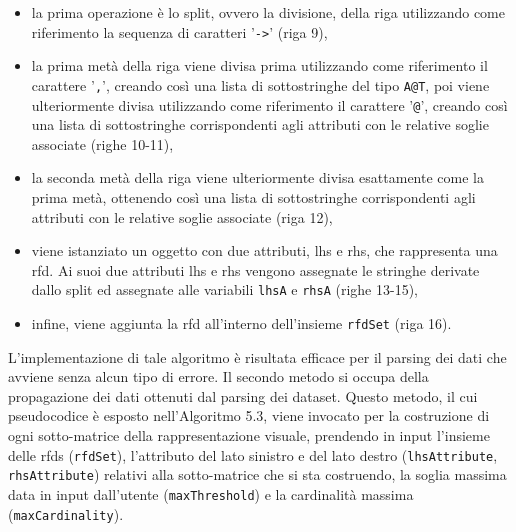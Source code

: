 \begin{itemize}
    \item la prima operazione \`{e} lo split, ovvero la divisione, della riga utilizzando come riferimento la sequenza di caratteri '\texttt{->}' (riga 9),
    \item la prima met\`{a} della riga viene divisa prima utilizzando come riferimento il carattere '\texttt{,}', creando cos\`{i} una lista di sottostringhe del tipo \texttt{A@T}, poi viene ulteriormente divisa utilizzando come riferimento il carattere '\texttt{@}', creando cos\`{i} una lista di sottostringhe corrispondenti agli attributi con le relative soglie associate (righe 10-11),
    \item la seconda met\`{a} della riga viene ulteriormente divisa esattamente come la prima met\`{a}, ottenendo cos\`{i} una lista di sottostringhe corrispondenti agli attributi con le relative soglie associate (riga 12),
    \item viene istanziato un oggetto con due attributi, lhs e rhs, che rappresenta una \acrshort{rfd}. Ai suoi due attributi lhs e rhs vengono assegnate le stringhe derivate dallo split ed assegnate alle variabili \texttt{lhsA} e \texttt{rhsA} (righe 13-15),
    \item infine, viene aggiunta la \acrshort{rfd} all'interno dell'insieme \texttt{rfdSet} (riga 16).
\end{itemize}
L'implementazione di tale algoritmo \`{e} risultata efficace per il parsing dei dati che avviene senza alcun tipo di errore. Il secondo metodo si occupa della propagazione dei dati ottenuti dal parsing dei dataset. Questo metodo, il cui pseudocodice \`{e} esposto nell'Algoritmo 5.3, viene invocato per la costruzione di ogni sotto-matrice della rappresentazione visuale, prendendo in input l'insieme delle \acrshort{rfds} (\texttt{rfdSet}), l'attributo del lato sinistro e del lato destro (\texttt{lhsAttribute}, \texttt{rhsAttribute}) relativi alla sotto-matrice che si sta costruendo, la soglia massima data in input dall'utente (\texttt{maxThreshold}) e la cardinalit\`{a} massima (\texttt{maxCardinality}).\par
